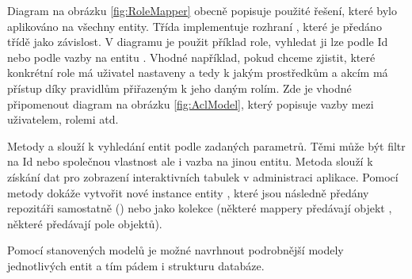 
Diagram na obrázku \ref{fig:RoleMapper} obecně popisuje použité řešení, které bylo aplikováno na všechny entity. Třída  implementuje rozhraní , které je předáno třídě  jako závislost. V diagramu je použit příklad role, vyhledat ji lze podle Id nebo podle vazby na entitu . Vhodné například, pokud chceme zjistit, které konkrétní role má uživatel nastaveny a tedy k jakým prostředkům a akcím má přístup díky pravidlům přiřazeným k jeho daným rolím. Zde je vhodné připomenout diagram na obrázku \ref{fig:AclModel}, který popisuje vazby mezi uživatelem, rolemi atd.

Metody  a  slouží k vyhledání entit podle zadaných parametrů. Těmi může být filtr na Id nebo společnou vlastnost ale i vazba na jinou entitu. Metoda  slouží k získání dat pro zobrazení interaktivních tabulek v administraci aplikace. Pomocí metody  dokáže vytvořit nové instance entity , které jsou následně předány repozitáři samostatně () nebo jako kolekce (některé mappery předávají objekt , některé předávají pole objektů).


Pomocí stanovených modelů je možné navrhnout podrobnější modely jednotlivých entit a tím pádem i strukturu databáze.
\clearpage